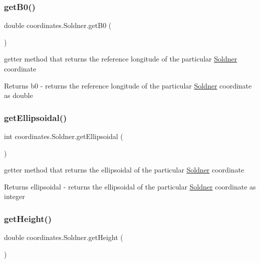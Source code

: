 \subsubsection{\texorpdfstring{get\+B0()}{getB0()}}
{\footnotesize\ttfamily double coordinates.\+Soldner.\+get\+B0 (\begin{DoxyParamCaption}{ }\end{DoxyParamCaption})}



getter method that returns the reference longitude of the particular \hyperlink{classcoordinates_1_1_soldner}{Soldner} coordinate 

\begin{DoxyReturn}{Returns}
b0 -\/ returns the reference longitude of the particular \hyperlink{classcoordinates_1_1_soldner}{Soldner} coordinate as double 
\end{DoxyReturn}
\mbox{\label{classcoordinates_1_1_soldner_ace54cd7d0157cf876c22e7877fc65c01}} 
\subsubsection{\texorpdfstring{get\+Ellipsoidal()}{getEllipsoidal()}}
{\footnotesize\ttfamily int coordinates.\+Soldner.\+get\+Ellipsoidal (\begin{DoxyParamCaption}{ }\end{DoxyParamCaption})}



getter method that returns the ellipsoidal of the particular \hyperlink{classcoordinates_1_1_soldner}{Soldner} coordinate 

\begin{DoxyReturn}{Returns}
ellipsoidal -\/ returns the ellipsoidal of the particular \hyperlink{classcoordinates_1_1_soldner}{Soldner} coordinate as integer 
\end{DoxyReturn}
\mbox{\label{classcoordinates_1_1_soldner_a0b9ff78b3e7f94bef19549746c67ea92}} 
\subsubsection{\texorpdfstring{get\+Height()}{getHeight()}}
{\footnotesize\ttfamily double coordinates.\+Soldner.\+get\+Height (\begin{DoxyParamCaption}{ }\end{DoxyParamCaption})}



